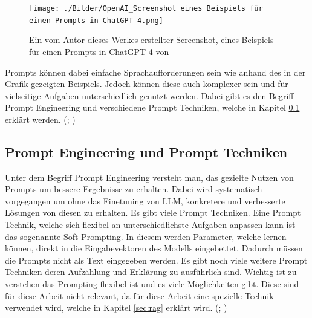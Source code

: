 \documentclass[12pt,toc=bib,toc=listof]{scrreprt}
\begin{document}
\begin{figure} [H]
    \centering
    \texttt{[image: ./Bilder/OpenAI\_Screenshot eines Beispiels für einen Prompts in ChatGPT-4.png]}
    \caption{Ein vom Autor dieses Werkes erstellter Screenshot, eines Beispiels für einen Prompts in ChatGPT-4 von \textcite{OpenAI2025}}
    \label{fig:enter-label}
\end{figure}

\noindent Prompts können dabei einfache Sprachaufforderungen sein wie anhand des in der Grafik gezeigten Beispiels. Jedoch können diese auch komplexer sein und für vielseitige Aufgaben unterschiedlich genutzt werden. Dabei gibt es den Begriff Prompt Engineering und verschiedene Prompt Techniken, welche in Kapitel \ref{sec:promptEngineeringUndPromptTechniken} erklärt werden. (\cite{Gu2023}; \cite{Liu2023})
\newpage

\subsection{Prompt Engineering und Prompt Techniken} %
\label{sec:promptEngineeringUndPromptTechniken}
Unter dem Begriff Prompt Engineering versteht man, das gezielte Nutzen von Prompts um bessere Ergebnisse zu erhalten. Dabei wird systematisch vorgegangen um ohne das Finetuning von LLM, konkretere und verbesserte Lösungen von diesen zu erhalten. Es gibt viele Prompt Techniken. Eine Prompt Technik, welche sich flexibel an unterschiedlichste Aufgaben anpassen kann ist das sogenannte Soft Prompting. In diesem werden Parameter, welche lernen können, direkt in die Eingabevektoren des Modells eingebettet. Dadurch müssen die Prompts nicht als Text eingegeben werden. Es gibt noch viele weitere Prompt Techniken deren Aufzählung und Erklärung zu ausführlich sind. Wichtig ist zu verstehen das Prompting flexibel ist und es viele Möglichkeiten gibt. Diese sind für diese Arbeit nicht relevant, da für diese Arbeit eine spezielle Technik verwendet wird, welche in Kapitel \ref{sec:rag} erklärt wird. (\cite{Gu2023}; \cite{Liu2023})
\end{document}

